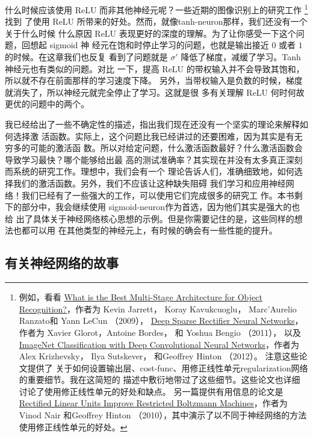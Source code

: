 什么时候应该使用 ReLU 而非其他神经元呢？一些近期的图像识别上的研究工作
\footnote{例如，看看
  \href{http://yann.lecun.com/exdb/publis/pdf/jarrett-iccv-09.pdf}{What is the
    Best Multi-Stage Architecture for Object Recognition?}，作者为 Kevin Jarrett，
  Koray Kavukcuoglu， Marc'Aurelio Ranzato和 Yann LeCun （2009），
  \href{http://www.jmlr.org/proceedings/papers/v15/glorot11a.html}{Deep Sparse
    Rectiﬁer Neural Networks}，作者为 Xavier Glorot，Antoine Bordes， 和 Yoshua
  Bengio （2011）， 以及
  \href{https://papers.nips.cc/paper/4824-imagenet-classification-with-deep-convolutional-neural-networks.pdf}{ImageNet
    Classification with Deep Convolutional Neural Networks}，作者为 Alex
  Krizhevsky， Ilya Sutskever， 和Geoffrey Hinton （2012）。 注意这些论文提供了
  关于如何设置输出层、\gls*{cost-func}、用修正线性单元\gls*{regularization}网络的重要细节。我在这简短的
  描述中敷衍地带过了这些细节。这些论文也详细讨论了使用修正线性单元的好处和缺点。
  另一篇提供有用信息的论文是
  \href{https://www.cs.toronto.edu/~hinton/absps/reluICML.pdf}{Rectified Linear
    Units Improve Restricted Boltzmann Machines}，作者为 Vinod Nair 和Geoffrey
  Hinton （2010），其中演示了以不同于神经网络的方法使用修正线性单元的好处。}找到
了使用 ReLU 所带来的好处。然而，就像\gls*{tanh-neuron}那样，我们还没有一个关于什么时候
什么原因 ReLU 表现更好的深度的理解。为了让你感受一下这个问题，回想起 sigmoid 神
经元在饱和时停止学习的问题，也就是输出接近 $0$ 或者 $1$ 的时候。在这章我们也反复
看到了问题就是 $\sigma'$ 降低了梯度，减缓了学习。Tanh 神经元也有类似的问题。对比
一下，提高 ReLU 的带权输入并不会导致其饱和，所以就不存在前面那样的学习速度下降。
另外，当带权输入是负数的时候，梯度就消失了，所以神经元就完全停止了学习。这就是很
多有关理解 ReLU 何时何故更优的问题中的两个。

我已经给出了一些不确定性的描述，指出我们现在还没有一个坚实的理论来解释如何选择激
活函数。实际上，这个问题比我已经讲过的还要困难，因为其实是有无穷多的可能的激活函
数。所以对给定问题，什么激活函数最好？什么激活函数会导致学习最快？哪个能够给出最
高的测试准确率？其实现在并没有太多真正深刻而系统的研究工作。理想中，我们会有一个
理论告诉人们，准确细致地，如何选择我们的激活函数。另外，我们不应该让这种缺失阻碍
我们学习和应用神经网络！我们已经有了一些强大的工作，可以使用它们完成很多的研究工
作。本书剩下的部分中，我会继续使用 \gls*{sigmoid-neuron}作为首选，因为他们其实是强大的也给
出了具体关于神经网络核心思想的示例。但是你需要记住的是，这些同样的想法也都可以用
在其他类型的神经元上，有时候的确会有一些性能的提升。

\subsection{有关神经网络的故事}

